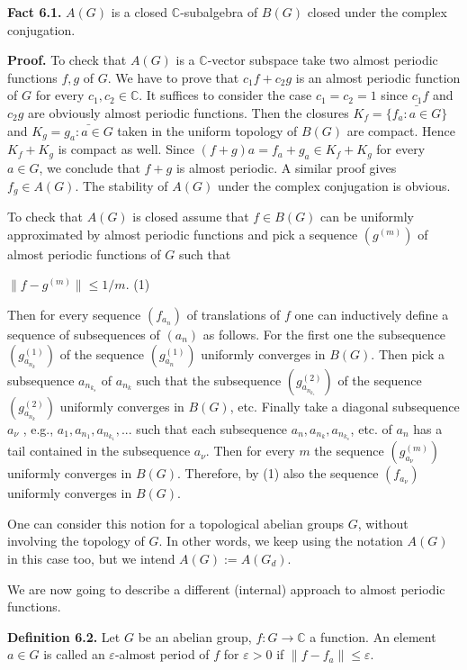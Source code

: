 \documentclass[12pt]{article}
\begin{document}
    \textbf{Fact 6.1.} $A(G)$ is a closed $\mathbb{C}$-subalgebra of $B(G)$ closed under the complex conjugation.


    \textbf{Proof.} To check that $A(G)$ is a $\mathbb{C}$-vector subspace take two almost periodic functions $f , g$ of $G$. We have to prove that
$c_1 f + c_2 g$ is an almost periodic function of $G$ for every $c_1, c_2 \in \mathbb{C}$. It suffices to consider the case $c_1 = c_2 = 1$ since $c_1 f$
and $c_2 g$ are obviously almost periodic functions. Then the closures $K_f = \bar{ \{f_a: a \in G \}}$ and $K_g = \bar{{g_a: a \in G}}$ taken in the
uniform topology of $B(G)$ are compact. Hence $K_f + K_g$ is compact as well. Since $(f + g)a = f_a + g_a \in K_f + K_g$ for every
$a \in G$, we conclude that $f + g$ is almost periodic. A similar proof gives $f_g \in A(G)$. The stability of $A(G)$ under the complex
conjugation is obvious.


    To check that $A(G)$ is closed assume that $f \in B(G)$ can be uniformly approximated by almost periodic functions and pick
a sequence $(g^{(m)})$ of almost periodic functions of $G$ such that


    $\|f - g^{(m)}\| \leq 1/m.$ (1)


Then for every sequence $(f_{a_n})$ of translations of $f$ one can inductively define a sequence of subsequences of $(a_n)$ as follows.
For the first one the subsequence $(g^{(1)}_{a_{n_k}})$ of the sequence $(g^{(1)}_{a_n})$ uniformly converges in $B(G)$. Then pick a subsequence $a_{n_{k_s}}$
of ${a_{n_k}}$ such that the subsequence $(g^{(2)}_{a_{n_{k_s}}})$ of the sequence $(g^{(2)}_{a_{n_k}})$ uniformly converges in $B(G)$, etc. Finally take a diagonal
subsequence $a_\nu$ , e.g., $a_1, a_{n_1} ,a_{n_{k_1}},...$ such that each subsequence $a_n, a_{n_k} , a_{n_{k_{s}}}$, etc. of $a_n$ has a tail contained in the
subsequence $a_\nu$. Then for every $m$ the sequence $(g^{(m)}_{a_\nu})$ uniformly converges in $B(G)$. Therefore, by (1) also the sequence $(f_{a_\nu})$
uniformly converges in $B(G)$. 


    One can consider this notion for a topological abelian groups $G$, without involving the topology of $G$. In other words, we
keep using the notation $A(G)$ in this case too, but we intend $A(G) := A(G_d)$.


    We are now going to describe a different (internal) approach to almost periodic functions.


\textbf{Definition 6.2.} Let $G$ be an abelian group, $f : G \to \mathbb{C}$ a function. An element $a \in G$ is called an $\varepsilon$-almost period of $f$ for $\varepsilon > 0$
if $\| f - f_a\| \leq \varepsilon$.
\end{document}
